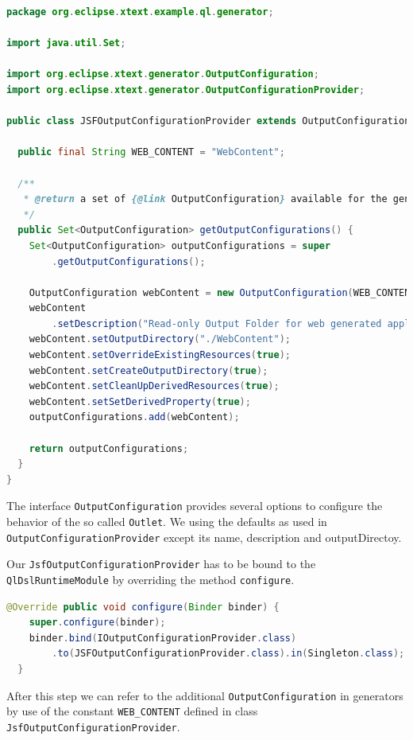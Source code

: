 \begin{lstlisting}[language=Java]
package org.eclipse.xtext.example.ql.generator;

import java.util.Set;

import org.eclipse.xtext.generator.OutputConfiguration;
import org.eclipse.xtext.generator.OutputConfigurationProvider;

public class JSFOutputConfigurationProvider extends OutputConfigurationProvider {

  public final String WEB_CONTENT = "WebContent";

  /**
   * @return a set of {@link OutputConfiguration} available for the generator
   */
  public Set<OutputConfiguration> getOutputConfigurations() {
    Set<OutputConfiguration> outputConfigurations = super
        .getOutputConfigurations();

    OutputConfiguration webContent = new OutputConfiguration(WEB_CONTENT);
    webContent
        .setDescription("Read-only Output Folder for web generated application artifacts");
    webContent.setOutputDirectory("./WebContent");
    webContent.setOverrideExistingResources(true);
    webContent.setCreateOutputDirectory(true);
    webContent.setCleanUpDerivedResources(true);
    webContent.setSetDerivedProperty(true);
    outputConfigurations.add(webContent);

    return outputConfigurations;
  }
}
\end{lstlisting}

The interface \texttt{OutputConfiguration} provides several options to configure
the behavior of the so called \texttt{Outlet}. We using the defaults as used in
\texttt{OutputConfigurationProvider} except its name, description and
outputDirectoy.

Our \texttt{JsfOutputConfigurationProvider} has to be bound to the
\texttt{QlDslRuntimeModule} by overriding the method \texttt{configure}. 

\begin{lstlisting}[language=Java]
@Override public void configure(Binder binder) {
    super.configure(binder);
    binder.bind(IOutputConfigurationProvider.class)
        .to(JSFOutputConfigurationProvider.class).in(Singleton.class);
  }
 \end{lstlisting}
 
After
this step we can refer to the additional \texttt{OutputConfiguration} in
generators by use of the constant \texttt{WEB\_CONTENT} defined in class
\texttt{JsfOutputConfigurationProvider}.

